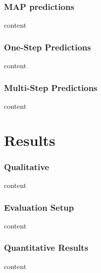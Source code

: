 \begin{frame}
    \frametitle{MAP predictions}

    content
\end{frame}

\begin{frame}
    \frametitle{One-Step Predictions}

    content
\end{frame}

\begin{frame}
    \frametitle{Multi-Step Predictions}

    content
\end{frame}

\section{Results}
\begin{frame}
    \frametitle{Qualitative}

    content
\end{frame}

\begin{frame}
    \frametitle{Evaluation Setup}

    content
\end{frame}

\begin{frame}
    \frametitle{Quantitative Results}

    content
\end{frame}


